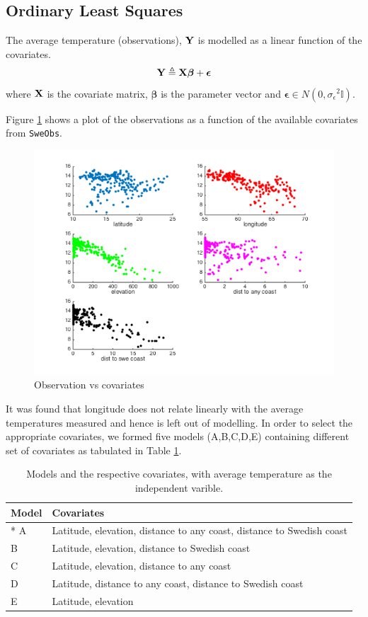 \documentclass[a4paper,10pt]{article}
\def\bY{{\bf Y}}
\def\bX{{\bf X}}
\def\bbeta{{\boldsymbol \beta}}
\def\sigmaeps{{\sigma_{\epsilon}}}
\begin{document}
\subsection{Ordinary Least Squares}
The average temperature (observations), $\bY$ is modelled as a linear function of the covariates. 
\begin{equation*}
  \bY \triangleq \bX \bbeta +  {\boldsymbol \epsilon} 
\end{equation*}
where $\bX$ is the covariate matrix, $\bbeta$ is the parameter vector and ${\boldsymbol \epsilon} \in N(0, \sigmaeps^2 \mathbb{I})$.

Figure \ref{fig:covariates} shows a plot of the observations as a function of the available covariates from {\texttt{SweObs}}.
\begin{figure}[ht]
	\includegraphics[width=0.8\linewidth]{covariates.png}
	\caption{Observation vs covariates}
	\label{fig:covariates}
\end{figure}
It was found that longitude does not relate linearly with the average temperatures measured and hence is left out of modelling. In order to select the appropriate covariates, we formed five models (A,B,C,D,E) containing different set of covariates as tabulated in Table \ref{tab:models}.
\begin{table}[H]
\centering
\begin{tabular}{lp{9cm}}
\hline
{\bf Model} & {\bf Covariates} \\
\hline
* A & Latitude, elevation, distance to any coast, distance to Swedish coast\\
 B & Latitude, elevation, distance to Swedish coast\\
 C & Latitude, elevation, distance to any coast\\
 D & Latitude, distance to any coast, distance to Swedish coast\\
 E & Latitude, elevation\\
\hline
\end{tabular}
\caption{Models and the respective covariates, with average temperature as the independent varible.}
\label{tab:models}
\end{table}
\end{document}
